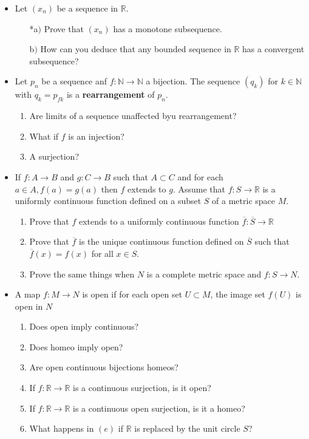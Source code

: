 \documentclass[11pt,a4paper]{article}
\newcommand{\pnum}[1]{\item[\textbf{#1}]}
\newcommand{\N}{\mathbb{N}}
\newcommand{\R}{\mathbb{R}}
\begin{document}
\begin{itemize}
	\pnum{2.31} Let $(x_n)$ be a sequence in $\R$.
	\begin{enumerate}
		\item[*a$)$] Prove that $(x_n)$ has a monotone subsequence.
		\item[b$)$] How can you deduce that any bounded sequence in $\R$ has a convergent subsequence? 
	\end{enumerate}

	\pnum{2.32} Let $p_n$ be a sequence anf $f : \N \to \N$ a bijection. The sequence $(q_k)$ for $k \in \N$ with $q_k = p_{f k}$ is a \textbf{rearrangement} of $p_n$.
	\begin{enumerate}[label=\alph*)]
		\item Are limits of a sequence unaffected byu rearrangement?
		\item What if $f$ is an injection?
		\item A surjection?
	\end{enumerate}

	\pnum{2.33} If $f : A \to B$ and $g : C \to B$ such that $A \subset C$ and for each $a \in A, f(a) = g(a)$ then $f$ extends to $g$. Assume that $f : S \to \R$ is a uniformly continuous function defined on a subset $S$ of a metric space $M$.
	\begin{enumerate}[label=\alph*)]
		\item Prove that $f$ extends to a uniformly continuous function $\overline{f} : \overline{S} \to \R$
		\item Prove that $\overline{f}$ is the unique continuous function defined on $\overline{S}$ such that $\overline{f}(x) = f(x)$ for all $x \in S$.
		\item Prove the same things when $N$ is a complete metric space and $f : S \to N$.
	\end{enumerate}

	\pnum{2.34} A map $f : M \to N$ is open if for each open set $U \subset M$, the image set $f(U)$ is open in $N$
	\begin{enumerate}[label=\alph*)]
		\item Does open imply continuous?
		\item Does homeo imply open?
		\item Are open continuous bijections homeos?
		\item If $f : \R \to \R$ is a continuous surjection, is it open?
		\item If $f : \R \to \R$ is a continuous open surjection, is it a homeo?
		\item What happens in $(e)$ if $\R$ is replaced by the unit circle $S$?


\end{enumerate}
\end{itemize}
\end{document}
